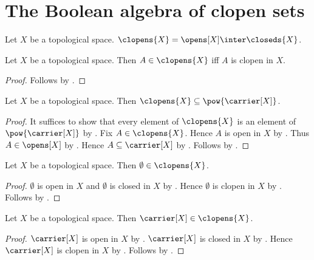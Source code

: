 \section{The Boolean algebra of clopen sets}




\begin{definition}\label{clopens}
    Let $X$ be a topological space.
    $\clopens{X}=\opens[X]\inter\closeds{X}$.
\end{definition}

\begin{proposition}\label{clopens_iff}
    Let $X$ be a topological space.
    Then $A\in\clopens{X}$ iff $A$ is clopen in $X$.
\end{proposition}
\begin{proof}
    Follows by
        .
\end{proof}

\begin{proposition}\label{clopens_subseteq_powerset}
    Let $X$ be a topological space.
    Then $\clopens{X}\subseteq\pow{\carrier[X]}$.
\end{proposition}
\begin{proof}
    It suffices to show that every element of $\clopens{X}$ is an
        element of $\pow{\carrier[X]}$ by .
    Fix $A\in\clopens{X}$.
    Hence $A$ is open in $X$ by
        .
    Thus $A\in\opens[X]$ by .
    Hence $A\subseteq\carrier[X]$ by .
    Follows by .
\end{proof}

\begin{proposition}\label{clopens_emptyset}
    Let $X$ be a topological space.
    Then $\emptyset\in\clopens{X}$.
\end{proposition}
\begin{proof}
    $\emptyset$ is open in $X$ and $\emptyset$ is closed in $X$ by
        .
    Hence $\emptyset$ is clopen in $X$ by .
    Follows by .
\end{proof}

\begin{proposition}\label{clopens_carrier}
    Let $X$ be a topological space.
    Then $\carrier[X]\in\clopens{X}$.
\end{proposition}
\begin{proof}
    $\carrier[X]$ is open in $X$ by .
    $\carrier[X]$ is closed in $X$ by .
    Hence $\carrier[X]$ is clopen in $X$ by .
    Follows by .
\end{proof}

